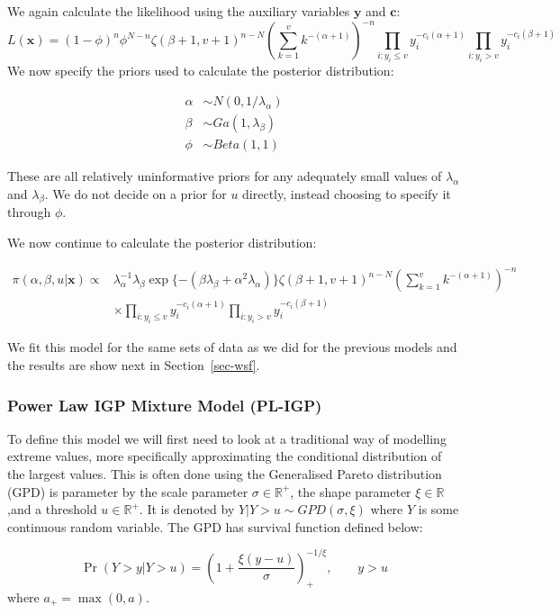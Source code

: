 \documentclass[
]{article}
\begin{document}
We again calculate the likelihood using the auxiliary variables
\(\boldsymbol{y}\) and \(\boldsymbol{c}\): \[
L(\boldsymbol{x}) = (1-\phi)^n\phi^{N-n}\zeta(\beta+1, v+1)^{n-N}\left(\sum_{k=1}^v k^{-(\alpha+1)}\right)^{-n}\prod_{i:y_i\le v}y_i^{-c_i(\alpha+1)}\prod_{i:y_i>v}y_i^{-c_i(\beta+1)}
\] We now specify the priors used to calculate the posterior
distribution:

\begin{align*}
\alpha &\sim N(0,1/\lambda_\alpha)\\
\beta &\sim Ga(1,\lambda_\beta)\\
\phi &\sim Beta(1,1)
\end{align*}

These are all relatively uninformative priors for any adequately small
values of \(\lambda_\alpha\) and \(\lambda_\beta\). We do not decide on
a prior for \(u\) directly, instead choosing to specify it through
\(\phi\).

We now continue to calculate the posterior distribution:

\begin{align*}
\pi(\alpha, \beta, u|\boldsymbol{x}) \propto &\lambda_\alpha^{-1}\lambda_\beta\exp\{-(\beta\lambda_\beta + \alpha^2\lambda_\alpha)\}\zeta(\beta+1, v+1)^{n-N}\left(\sum_{k=1}^v k^{-(\alpha+1)}\right)^{-n}\\&\times\prod_{i:y_i\le v}y_i^{-c_i(\alpha+1)}\prod_{i:y_i>v}y_i^{-c_i(\beta+1)}
%
\end{align*}

We fit this model for the same sets of data as we did for the previous
models and the results are show next in Section~\ref{sec-wsf}.

\subsubsection{Power Law IGP Mixture Model (PL-IGP)}\label{sec-pli}

To define this model we will first need to look at a traditional way of
modelling extreme values, more specifically approximating the
conditional distribution of the largest values. This is often done using
the Generalised Pareto distribution (GPD) is parameter by the scale
parameter \(\sigma\in \mathbb{R}^+\), the shape parameter
\(\xi \in \mathbb{R}\) ,and a threshold \(u\in \mathbb{R}^+\). It is
denoted by \(Y|Y>u \sim GPD(\sigma,\xi)\) where \(Y\) is some continuous
random variable. The GPD has survival function defined below:

\[
\Pr(Y>y|Y>u) = \left(1+\frac{\xi(y-u)}{\sigma}\right)_+^{-1/\xi}, \qquad y>u
\] where \(a_+ = \max(0,a)\).
\end{document}
